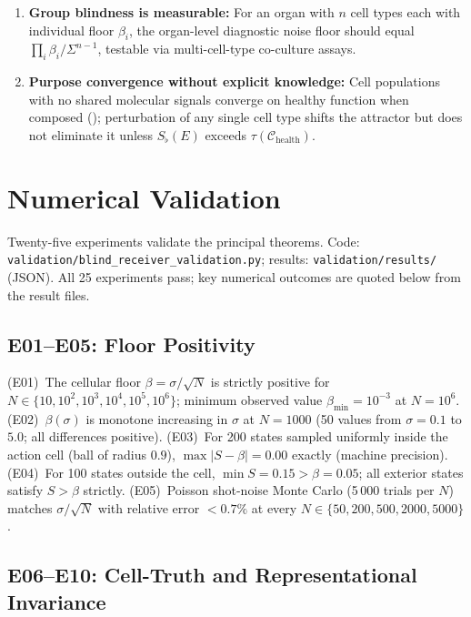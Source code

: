 \documentclass[twocolumn,11pt,a4paper]{article}
\newcommand{\Sfloor}{S_{\flat}}
\newcommand{\Cell}{\mathcal{C}}
\begin{document}
\begin{enumerate}[leftmargin=*,nosep,itemsep=3pt]
\item \textbf{Group blindness is measurable:}
For an organ with $n$ cell types each with individual floor $\beta_i$,
the organ-level diagnostic noise floor should equal
$\prod_i \beta_i / \Sigma^{n-1}$, testable via multi-cell-type
co-culture assays.

\item \textbf{Purpose convergence without explicit knowledge:}
Cell populations with no shared molecular signals converge on healthy
function when composed (); perturbation of any
single cell type shifts the attractor but does not eliminate it
unless $\Sfloor(E)$ exceeds $\tau(\Cell_{\mathrm{health}})$.

\end{enumerate}

\section{Numerical Validation}
\label{sec:validation}

Twenty-five experiments validate the principal theorems.
Code: \texttt{validation/blind\_receiver\_validation.py};
results: \texttt{validation/results/} (JSON).
All 25 experiments pass; key numerical outcomes are quoted below from
the result files.

\subsection{E01--E05: Floor Positivity}

(E01)~The cellular floor $\beta = \sigma/\!\sqrt{N}$ is strictly positive
for $N \in \{10, 10^2, 10^3, 10^4, 10^5, 10^6\}$; minimum observed value
$\beta_{\min} = 10^{-3}$ at $N = 10^6$.
(E02)~$\beta(\sigma)$ is monotone increasing in $\sigma$ at $N = 1000$
(50 values from $\sigma = 0.1$ to $5.0$; all differences positive).
(E03)~For 200 states sampled uniformly inside the action cell (ball of
radius $0.9$), $\max|S - \beta| = 0.00$ exactly (machine precision).
(E04)~For 100 states outside the cell, $\min S = 0.15 > \beta = 0.05$;
all exterior states satisfy $S > \beta$ strictly.
(E05)~Poisson shot-noise Monte Carlo (5\,000 trials per $N$) matches
$\sigma/\!\sqrt{N}$ with relative error $< 0.7\%$ at every
$N \in \{50, 200, 500, 2000, 5000\}$.

\subsection{E06--E10: Cell-Truth and Representational Invariance}
\end{document}
